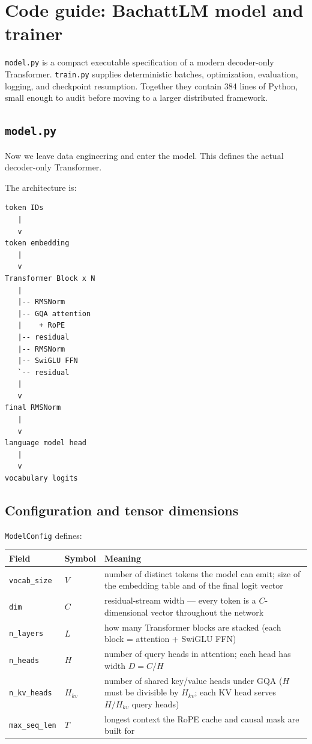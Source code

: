 \clearpage
\section{Code guide: BachattLM model and trainer}

\texttt{model.py} is a compact executable specification of a modern
decoder-only Transformer. \texttt{train.py} supplies deterministic batches,
optimization, evaluation, logging, and checkpoint resumption. Together they
contain 384 lines of Python, small enough to audit before moving to a larger
distributed framework.

\subsection{\texttt{model.py}}

Now we leave data engineering and enter the model. This defines the actual
decoder-only Transformer.

The architecture is:
\begin{lstlisting}[style=shadedpython,language={},basicstyle=\scriptsize\ttfamily]
token IDs
   |
   v
token embedding
   |
   v
Transformer Block x N
   |
   |-- RMSNorm
   |-- GQA attention
   |    + RoPE
   |-- residual
   |-- RMSNorm
   |-- SwiGLU FFN
   `-- residual
   |
   v
final RMSNorm
   |
   v
language model head
   |
   v
vocabulary logits
\end{lstlisting}

\subsection{Configuration and tensor dimensions}

\texttt{ModelConfig} defines:
\begin{center}
  \renewcommand{\arraystretch}{1.25}
  \small
  \begin{tabular}{@{}l l p{}@{}}
    \textbf{Field} & \textbf{Symbol} & \textbf{Meaning} \\
    \hline
    \texttt{vocab\_size} & \(V\) &
    number of distinct tokens the model can emit; size of the embedding
    table and of the final logit vector \\
    \texttt{dim} & \(C\) &
    residual-stream width --- every token is a \(C\)-dimensional vector
    throughout the network \\
    \texttt{n\_layers} & \(L\) &
    how many Transformer blocks are stacked (each block =
    attention + SwiGLU FFN) \\
    \texttt{n\_heads} & \(H\) &
    number of query heads in attention; each head has width
    \(D=C/H\) \\
    \texttt{n\_kv\_heads} & \(H_{kv}\) &
    number of shared key/value heads under GQA (\(H\) must be divisible
    by \(H_{kv}\); each KV head serves \(H/H_{kv}\) query heads) \\
    \texttt{max\_seq\_len} & \(T\) &
    longest context the RoPE cache and causal mask are built for
  \end{tabular}
\end{center}

